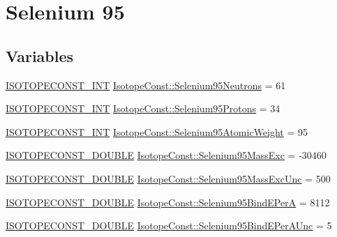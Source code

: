 \hypertarget{group___isotope_const-_selenium-_se95}{}\section{Selenium 95}
\label{group___isotope_const-_selenium-_se95}
\subsection*{Variables}
\begin{DoxyCompactItemize}
\item 
\mbox{\hyperlink{group___isotope_const-_macros_ga5f18360b3e99483a35c32d789e62621c}{I\+S\+O\+T\+O\+P\+E\+C\+O\+N\+S\+T\+\_\+\+I\+NT}} \mbox{\hyperlink{group___isotope_const-_selenium-_se95_ga1e548da4afe6e2660d5bba841535a945}{Isotope\+Const\+::\+Selenium95\+Neutrons}} = 61
\item 
\mbox{\hyperlink{group___isotope_const-_macros_ga5f18360b3e99483a35c32d789e62621c}{I\+S\+O\+T\+O\+P\+E\+C\+O\+N\+S\+T\+\_\+\+I\+NT}} \mbox{\hyperlink{group___isotope_const-_selenium-_se95_gabe9fca570c7b88463b4879ab170fe22c}{Isotope\+Const\+::\+Selenium95\+Protons}} = 34
\item 
\mbox{\hyperlink{group___isotope_const-_macros_ga5f18360b3e99483a35c32d789e62621c}{I\+S\+O\+T\+O\+P\+E\+C\+O\+N\+S\+T\+\_\+\+I\+NT}} \mbox{\hyperlink{group___isotope_const-_selenium-_se95_gaa0812d397aeda6ef03a2e8c65eff6599}{Isotope\+Const\+::\+Selenium95\+Atomic\+Weight}} = 95
\item 
\mbox{\hyperlink{group___isotope_const-_macros_ga8f45a7272ce02c0b4c65c44636ed719a}{I\+S\+O\+T\+O\+P\+E\+C\+O\+N\+S\+T\+\_\+\+D\+O\+U\+B\+LE}} \mbox{\hyperlink{group___isotope_const-_selenium-_se95_ga906ecf1375985af45551bf6cf8c4601f}{Isotope\+Const\+::\+Selenium95\+Mass\+Exc}} = -\/30460
\item 
\mbox{\hyperlink{group___isotope_const-_macros_ga8f45a7272ce02c0b4c65c44636ed719a}{I\+S\+O\+T\+O\+P\+E\+C\+O\+N\+S\+T\+\_\+\+D\+O\+U\+B\+LE}} \mbox{\hyperlink{group___isotope_const-_selenium-_se95_ga133bf3f6c3099448cafd502560a32710}{Isotope\+Const\+::\+Selenium95\+Mass\+Exc\+Unc}} = 500
\item 
\mbox{\hyperlink{group___isotope_const-_macros_ga8f45a7272ce02c0b4c65c44636ed719a}{I\+S\+O\+T\+O\+P\+E\+C\+O\+N\+S\+T\+\_\+\+D\+O\+U\+B\+LE}} \mbox{\hyperlink{group___isotope_const-_selenium-_se95_gafc079726c23b6243700a417d95c14548}{Isotope\+Const\+::\+Selenium95\+Bind\+E\+PerA}} = 8112
\item 
\mbox{\hyperlink{group___isotope_const-_macros_ga8f45a7272ce02c0b4c65c44636ed719a}{I\+S\+O\+T\+O\+P\+E\+C\+O\+N\+S\+T\+\_\+\+D\+O\+U\+B\+LE}} \mbox{\hyperlink{group___isotope_const-_selenium-_se95_ga583e4c4d2025792814810439259ca5c8}{Isotope\+Const\+::\+Selenium95\+Bind\+E\+Per\+A\+Unc}} = 5

\end{DoxyCompactItemize}
